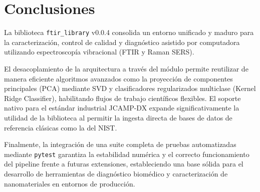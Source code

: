 \section{Conclusiones}
La biblioteca \texttt{ftir\_library} v0.0.4 consolida un entorno unificado y maduro para la caracterización, control de calidad y diagnóstico asistido por computadora utilizando espectroscopía vibracional (FTIR y Raman SERS). 

El desacoplamiento de la arquitectura a través del módulo  permite reutilizar de manera eficiente algoritmos avanzados como la proyección de componentes principales (PCA) mediante SVD y clasificadores regularizados multiclase (Kernel Ridge Classifier), habilitando flujos de trabajo científicos flexibles. El soporte nativo para el estándar industrial JCAMP-DX expande significativamente la utilidad de la biblioteca al permitir la ingesta directa de bases de datos de referencia clásicas como la del NIST. 

Finalmente, la integración de una suite completa de pruebas automatizadas mediante \texttt{pytest} garantiza la estabilidad numérica y el correcto funcionamiento del pipeline frente a futuras extensiones, estableciendo una base sólida para el desarrollo de herramientas de diagnóstico biomédico y caracterización de nanomateriales en entornos de producción.
\newpage